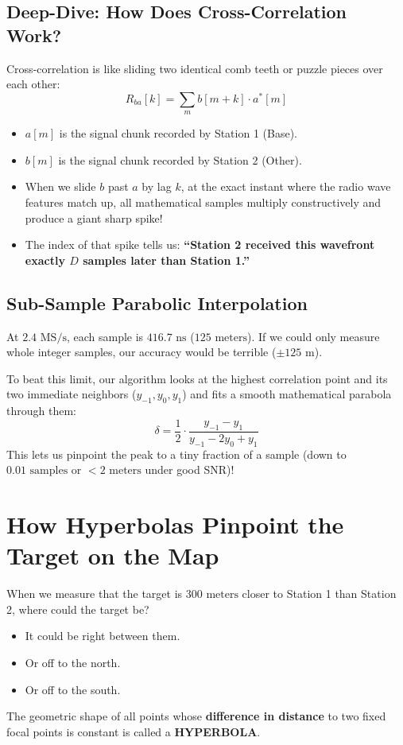 \documentclass[11pt,a4paper]{article}
\begin{document}
\subsection{Deep-Dive: How Does Cross-Correlation Work?}
Cross-correlation is like sliding two identical comb teeth or puzzle pieces over each other:
$$R_{ba}[k] = \sum_{m} b[m + k] \cdot a^*[m]$$
\begin{itemize}[leftmargin=*]
    \item $a[m]$ is the signal chunk recorded by Station 1 (Base).
    \item $b[m]$ is the signal chunk recorded by Station 2 (Other).
    \item When we slide $b$ past $a$ by lag $k$, at the exact instant where the radio wave features match up, all mathematical samples multiply constructively and produce a giant sharp spike!
    \item The index of that spike tells us: \textbf{``Station 2 received this wavefront exactly $D$ samples later than Station 1.''}
\end{itemize}

\subsection{Sub-Sample Parabolic Interpolation}
At $2.4\text{ MS/s}$, each sample is $416.7\text{ ns}$ ($125\text{ meters}$). If we could only measure whole integer samples, our accuracy would be terrible ($\pm 125\text{ m}$).

To beat this limit, our algorithm looks at the highest correlation point and its two immediate neighbors ($y_{-1}, y_0, y_1$) and fits a smooth mathematical parabola through them:
$$\delta = \frac{1}{2} \cdot \frac{y_{-1} - y_{1}}{y_{-1} - 2y_0 + y_1}$$
This lets us pinpoint the peak to a tiny fraction of a sample (down to $0.01\text{ samples}$ or $< 2\text{ meters}$ under good SNR)!

\section{How Hyperbolas Pinpoint the Target on the Map}

When we measure that the target is $300\text{ meters}$ closer to Station 1 than Station 2, where could the target be?
\begin{itemize}
    \item It could be right between them.
    \item Or off to the north.
    \item Or off to the south.
\end{itemize}
The geometric shape of all points whose \textbf{difference in distance} to two fixed focal points is constant is called a \textbf{HYPERBOLA}.
\end{document}
